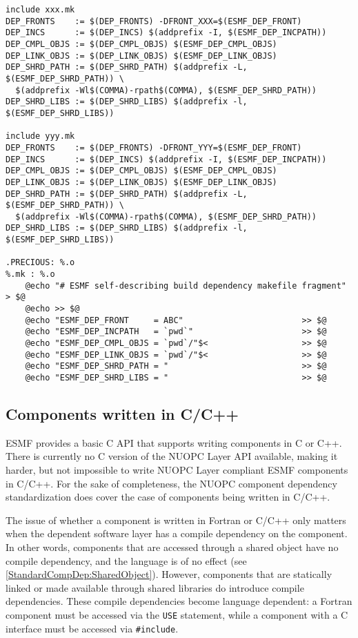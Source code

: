 \begin{verbatim}
include xxx.mk
DEP_FRONTS    := $(DEP_FRONTS) -DFRONT_XXX=$(ESMF_DEP_FRONT)
DEP_INCS      := $(DEP_INCS) $(addprefix -I, $(ESMF_DEP_INCPATH))
DEP_CMPL_OBJS := $(DEP_CMPL_OBJS) $(ESMF_DEP_CMPL_OBJS)
DEP_LINK_OBJS := $(DEP_LINK_OBJS) $(ESMF_DEP_LINK_OBJS)
DEP_SHRD_PATH := $(DEP_SHRD_PATH) $(addprefix -L, $(ESMF_DEP_SHRD_PATH)) \
  $(addprefix -Wl$(COMMA)-rpath$(COMMA), $(ESMF_DEP_SHRD_PATH))
DEP_SHRD_LIBS := $(DEP_SHRD_LIBS) $(addprefix -l, $(ESMF_DEP_SHRD_LIBS))

include yyy.mk
DEP_FRONTS    := $(DEP_FRONTS) -DFRONT_YYY=$(ESMF_DEP_FRONT)
DEP_INCS      := $(DEP_INCS) $(addprefix -I, $(ESMF_DEP_INCPATH))
DEP_CMPL_OBJS := $(DEP_CMPL_OBJS) $(ESMF_DEP_CMPL_OBJS)
DEP_LINK_OBJS := $(DEP_LINK_OBJS) $(ESMF_DEP_LINK_OBJS)
DEP_SHRD_PATH := $(DEP_SHRD_PATH) $(addprefix -L, $(ESMF_DEP_SHRD_PATH)) \
  $(addprefix -Wl$(COMMA)-rpath$(COMMA), $(ESMF_DEP_SHRD_PATH))
DEP_SHRD_LIBS := $(DEP_SHRD_LIBS) $(addprefix -l, $(ESMF_DEP_SHRD_LIBS))

.PRECIOUS: %.o
%.mk : %.o
	@echo "# ESMF self-describing build dependency makefile fragment" > $@
	@echo >> $@
	@echo "ESMF_DEP_FRONT     = ABC"                        >> $@
	@echo "ESMF_DEP_INCPATH   = `pwd`"                      >> $@
	@echo "ESMF_DEP_CMPL_OBJS = `pwd`/"$<                   >> $@
	@echo "ESMF_DEP_LINK_OBJS = `pwd`/"$<                   >> $@
	@echo "ESMF_DEP_SHRD_PATH = "                           >> $@
	@echo "ESMF_DEP_SHRD_LIBS = "                           >> $@
\end{verbatim}

\subsection{Components written in C/C++}
\label{StandardCompDep:C}

ESMF provides a basic C API that supports writing components in C or C++. There is currently no C version of the NUOPC Layer API available, making it harder, but not impossible to write NUOPC Layer compliant ESMF components in C/C++. For the sake of completeness, the NUOPC component dependency standardization does cover the case of components being written in C/C++.

The issue of whether a component is written in Fortran or C/C++ only matters when the dependent software layer has a compile dependency on the component.  In other words, components that are accessed through a shared object have no compile dependency, and the language is of no effect (see \ref{StandardCompDep:SharedObject}). However, components that are statically linked or made available through shared libraries do introduce compile dependencies. These compile dependencies become language dependent: a Fortran component must be accessed via the {\tt USE} statement, while a component with a C interface must be accessed via {\tt \#include}.


